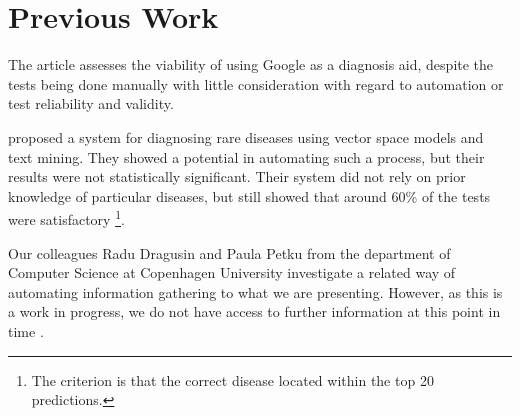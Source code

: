 \documentclass[10pt,letterpaper,final]{article}
\begin{document}
\section{Previous Work}
\label{chap:previouswork}
The article \cite{googlingdiagnosis} assesses the viability of using
Google as a diagnosis aid, despite the tests being done manually with
little consideration with regard to automation or test reliability and
validity. 

\cite{jensenandersen} proposed a system for diagnosing rare diseases
using vector space models and text mining. They showed a potential in
automating such a process, but their results were not statistically
significant. Their system did not rely on prior knowledge of particular
diseases, but still showed that around 60\% of the tests were
satisfactory \footnote{The criterion is that the correct disease located
within the top 20 predictions.}.

Our colleagues Radu Dragusin and Paula Petku from the department of
Computer Science at Copenhagen University investigate a related way of
automating information gathering to what we are presenting. However, as
this is a work in progress, we do not have access to further information
at this point in time \cite{radupaula}.







\end{document}
